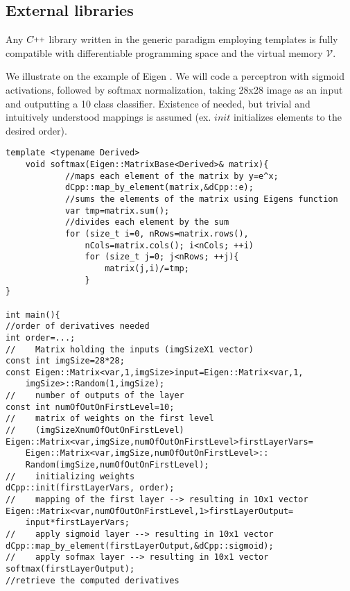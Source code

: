 \documentclass{article}
\newcommand{\VV}{\mathcal{V}}
\newcommand{\CC}{C\nolinebreak\hspace{-.05em}\raisebox{.4ex}{\tiny\bf +}\nolinebreak\hspace{-.10em}\raisebox{.4ex}{\tiny\bf +}}
\def\CC{{C\nolinebreak[4]\hspace{-.05em}\raisebox{.4ex}{\tiny\bf ++}}}
\begin{document}
\subsection{External libraries}

Any $\CC$ library written in the generic paradigm employing templates is fully compatible with differentiable programming space and the virtual memory $\VV$. 

We illustrate on the example of Eigen \cite{Eigen}. We will code a perceptron with sigmoid activations, followed by softmax normalization, taking 28x28 image as an input and outputting a 10 class classifier. Existence of needed, but trivial and intuitively understood mappings is assumed (ex. $init$ initializes elements to the desired order). 

\begin{lstlisting}
template <typename Derived>
    void softmax(Eigen::MatrixBase<Derived>& matrix){
            //maps each element of the matrix by y=e^x;
            dCpp::map_by_element(matrix,&dCpp::e);
            //sums the elements of the matrix using Eigens function
            var tmp=matrix.sum();
            //divides each element by the sum
            for (size_t i=0, nRows=matrix.rows(), 
            	nCols=matrix.cols(); i<nCols; ++i)
                for (size_t j=0; j<nRows; ++j){
                    matrix(j,i)/=tmp;
                }
}

int main(){
//order of derivatives needed
int order=...;
//    Matrix holding the inputs (imgSizeX1 vector)
const int imgSize=28*28;
const Eigen::Matrix<var,1,imgSize>input=Eigen::Matrix<var,1,
	imgSize>::Random(1,imgSize);
//    number of outputs of the layer
const int numOfOutOnFirstLevel=10;
//    matrix of weights on the first level 
//    (imgSizeXnumOfOutOnFirstLevel)
Eigen::Matrix<var,imgSize,numOfOutOnFirstLevel>firstLayerVars=
	Eigen::Matrix<var,imgSize,numOfOutOnFirstLevel>::
	Random(imgSize,numOfOutOnFirstLevel);
//    initializing weights
dCpp::init(firstLayerVars, order);
//    mapping of the first layer --> resulting in 10x1 vector
Eigen::Matrix<var,numOfOutOnFirstLevel,1>firstLayerOutput=
	input*firstLayerVars;
//    apply sigmoid layer --> resulting in 10x1 vector
dCpp::map_by_element(firstLayerOutput,&dCpp::sigmoid);
//    apply sofmax layer --> resulting in 10x1 vector
softmax(firstLayerOutput);
//retrieve the computed derivatives
\end{lstlisting}

  \printbibliography
  
\end{document}
